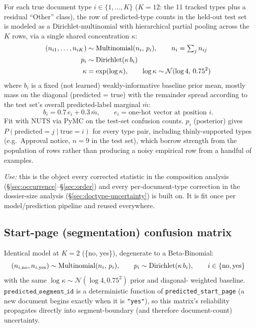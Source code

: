 For each true document type $i \in \{1,\dots,K\}$ ($K=12$: the 11 tracked
types plus a residual ``Other'' class), the row of predicted-type counts in
the held-out test set is modeled as a Dirichlet-multinomial with hierarchical
partial pooling across the $K$ rows, via a single shared concentration
$\kappa$:
\begin{align}
  (n_{i1}, \dots, n_{iK}) &\sim \mathrm{Multinomial}(n_i,\, p_i), \qquad n_i = \textstyle\sum_j n_{ij} \\
  p_i &\sim \mathrm{Dirichlet}(\kappa \, b_i) \\
  \kappa &= \exp(\log\kappa), \qquad \log\kappa \sim \mathcal{N}(\log 4,\, 0.75^2)
\end{align}
where $b_i$ is a fixed (not learned) weakly-informative baseline prior mean,
mostly mass on the diagonal (predicted = true) with the remainder spread
according to the test set's overall predicted-label marginal $\bar m$:
\begin{equation}
  b_i = 0.7 \, e_i + 0.3 \, \bar m, \qquad e_i = \text{one-hot vector at position } i.
\end{equation}
Fit with NUTS via PyMC on the test-set confusion counts.
$p_i$ (posterior) gives $P(\text{predicted}=j \mid \text{true}=i)$ for every
type pair, including thinly-supported types (e.g.\ Approval notice, $n=9$ in
the test set), which borrow strength from the population of rows rather than
producing a noisy empirical row from a handful of examples.

\textit{Use:} this is the object every corrected statistic in the composition
analysis (\S\ref{sec:occurrence}--\S\ref{sec:order}) and every per-document-type
correction in the dossier-size analysis (\S\ref{sec:doctype-uncertainty}) is
built on. It is fit once per model/prediction pipeline and reused everywhere.

\subsection{Start-page (segmentation) confusion matrix}
\label{sec:start-confusion}

Identical model at $K=2$ (\{no, yes\}), degenerate to a Beta-Binomial:
\begin{equation}
  (n_{i,\text{no}}, n_{i,\text{yes}}) \sim \mathrm{Multinomial}(n_i,\, p_i), \qquad
  p_i \sim \mathrm{Dirichlet}(\kappa\, b_i), \qquad i \in \{\text{no}, \text{yes}\}
\end{equation}
with the same $\log\kappa \sim \mathcal{N}(\log 4, 0.75^2)$ prior and diagonal-
weighted baseline. $\texttt{predicted\_segment\_id}$ is a deterministic
function of \texttt{predicted\_start\_page} (a new document begins exactly
when it is \texttt{"yes"}), so this matrix's reliability propagates directly
into segment-boundary (and therefore document-count) uncertainty.

